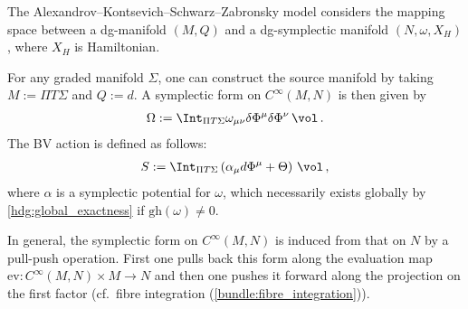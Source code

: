     \begin{example}
        The Alexandrov--Kontsevich--Schwarz--Zabronsky model considers the mapping space between a dg-manifold $(M,Q)$ and a dg-symplectic manifold $(N,\omega,X_H)$, where $X_H$ is Hamiltonian.

        For any graded manifold $\Sigma$, one can construct the source manifold by taking $M:=\Pi T\Sigma$ and $Q:=d$. A symplectic form on $C^\infty(M,N)$ is then given by
        \begin{gather}
            \Omega := \Int_{\Pi T\Sigma}\omega_{\mu\nu}\delta\Phi^\mu\delta\Phi^\nu\,\vol\,.
        \end{gather}
        The BV action is defined as follows:
        \begin{gather}
            S := \Int_{\Pi T\Sigma}\left(\alpha_\mu d\Phi^\mu+\Theta\right)\,\vol\,,
        \end{gather}
        where $\alpha$ is a symplectic potential for $\omega$, which necessarily exists globally by \cref{hdg:global_exactness} if $\mathrm{gh}(\omega)\neq0$.

        In general, the symplectic form on $C^\infty(M,N)$ is induced from that on $N$ by a pull-push operation. First one pulls back this form along the evaluation map $\mathrm{ev}:C^\infty(M,N)\times M\rightarrow N$ and then one pushes it forward along the projection on the first factor (cf.~fibre integration (\cref{bundle:fibre_integration})).

    \end{example}